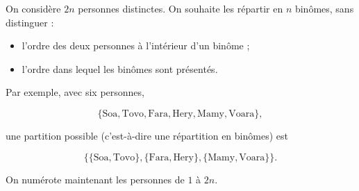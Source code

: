On considère \(2n\) personnes distinctes. On souhaite les répartir en
\(n\) binômes, sans distinguer :

\begin{itemize}
    \item l'ordre des deux personnes à l'intérieur d'un binôme ;
    \item l'ordre dans lequel les binômes sont présentés.
\end{itemize}

Par exemple, avec six personnes,

\[
\{\text{Soa},\text{Tovo},\text{Fara},\text{Hery},\text{Mamy},\text{Voara}\},
\]

une partition possible (c'est-à-dire une répartition en binômes) est

\[
\bigl\{
\{\text{Soa},\text{Tovo}\},
\{\text{Fara},\text{Hery}\},
\{\text{Mamy},\text{Voara}\}
\bigr\}.
\]

\begin{center}
\end{center}

On numérote maintenant les personnes de \(1\) à \(2n\).

